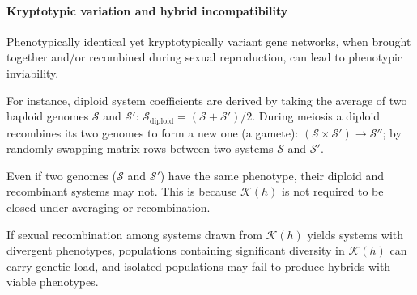 \documentclass{article}
\newcommand{\1}{\mathbbm{1}}
\newcommand{\Sys}{\mathcal{S}}
\newcommand{\allS}{\mathcal{K}(h)}
\begin{document}
\paragraph{Kryptotypic variation and hybrid incompatibility}
Phenotypically identical yet kryptotypically variant gene networks, when brought together and/or recombined during sexual reproduction, can lead to phenotypic inviability. 

For instance, diploid system coefficients are derived by taking the average of two haploid genomes $\Sys$ and $\Sys'$: $\Sys_{\text{diploid}} \! = \! \left(\Sys \! + \! \Sys'\right)\!/2$. During meiosis a diploid recombines its two genomes to form a new one (a gamete): $\left(\Sys \! \times \! \Sys' \right) \rightarrow \Sys''$; by randomly swapping matrix rows between two systems $\mathcal{S}$ and $\mathcal{S}'$.

Even if two genomes ($\Sys$ and $\Sys'$) have the same phenotype, their diploid and recombinant systems may not. This is because $\allS$ is not required to be closed under averaging or recombination. 

If sexual recombination among systems drawn from $\allS$ yields systems with divergent phenotypes, populations containing significant diversity in $\allS$ can carry genetic load, and isolated populations may fail to produce hybrids with viable phenotypes. 
\end{document}
